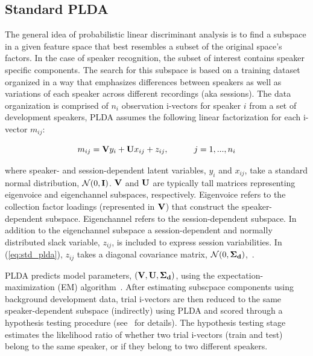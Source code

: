 \subsection{Standard PLDA}
\label{ssec:standard_plda}
The general idea of probabilistic linear discriminant analysis is to find a subspace in a given feature space that best resembles a subset of the original space's factors. 
In the case of speaker recognition, the subset of interest contains speaker specific components. 
The search for this subspace is based on a training dataset organized in a way that emphasizes differences between speakers as well as variations of each speaker across different recordings (aka sessions). 
The data organization is comprised of $n_i$ observation i-vectors for speaker $i$ from a set of development speakers, PLDA assumes the following linear factorization for each i-vector $m_{ij}$: 

\begin{equation}
\label{eq:std_plda}
m_{ij} = {\bf V}y_i+{\bf U}x_{ij}+z_{ij},  \hspace{30pt} j=1,...,n_i
\end{equation}

where speaker- and session-dependent latent variables, $y_i$ and $x_{ij}$, take a standard normal distribution, $\mathcal{N}(0,{\bf I})$. ${\bf V}$ and ${\bf U}$ are typically tall matrices representing eigenvoice and eigenchannel subspaces, respectively. Eigenvoice refers to the collection factor loadings (represented in ${\bf V}$) that construct the speaker-dependent subspace. Eigenchannel refers to the session-dependent subspace. 
In addition to the eigenchannel subspace a session-dependent and normally distributed slack variable, $z_{ij}$, is included to express session variabilities. In (\ref{eq:std_plda}), $z_{ij}$ takes a diagonal covariance matrix, $\mathcal{N}(0,{\bf \Sigma_d})$,~\cite{kenny_plda,prince_plda}. 

PLDA predicts model parameters, $({\bf V},{\bf U},{\bf \Sigma_d})$, using the expectation-maximization (EM) algorithm~\cite{prince_plda}. 
After estimating subscpace components using background development data, trial i-vectors are then reduced to the same speaker-dependent subspace (indirectly) using PLDA and scored through a hypothesis testing procedure (see~\cite{prince_plda} for details). 
The hypothesis testing stage estimates the likelihood ratio of whether two trial i-vectors (train and test) belong to the same speaker, or if they belong to two different speakers. 

